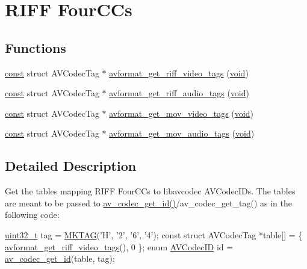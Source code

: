 \hypertarget{group__riff__fourcc}{}\section{R\+I\+FF Four\+C\+Cs}
\label{group__riff__fourcc}
\subsection*{Functions}
\begin{DoxyCompactItemize}
\item 
\hyperlink{getopt1_8c_a2c212835823e3c54a8ab6d95c652660e}{const} struct A\+V\+Codec\+Tag $\ast$ \hyperlink{group__riff__fourcc_ga036cfb1a22e899179f932df0cfc6c415}{avformat\+\_\+get\+\_\+riff\+\_\+video\+\_\+tags} (\hyperlink{sound_8c_ae35f5844602719cf66324f4de2a658b3}{void})
\item 
\hyperlink{getopt1_8c_a2c212835823e3c54a8ab6d95c652660e}{const} struct A\+V\+Codec\+Tag $\ast$ \hyperlink{group__riff__fourcc_ga8b9668cfd684804ebe7ab14b05aa3ba0}{avformat\+\_\+get\+\_\+riff\+\_\+audio\+\_\+tags} (\hyperlink{sound_8c_ae35f5844602719cf66324f4de2a658b3}{void})
\item 
\hyperlink{getopt1_8c_a2c212835823e3c54a8ab6d95c652660e}{const} struct A\+V\+Codec\+Tag $\ast$ \hyperlink{group__riff__fourcc_ga36261b12dba43e0cba5a753ecb3d0e54}{avformat\+\_\+get\+\_\+mov\+\_\+video\+\_\+tags} (\hyperlink{sound_8c_ae35f5844602719cf66324f4de2a658b3}{void})
\item 
\hyperlink{getopt1_8c_a2c212835823e3c54a8ab6d95c652660e}{const} struct A\+V\+Codec\+Tag $\ast$ \hyperlink{group__riff__fourcc_gac389e7f9cd19570bd599a61fd1884a4a}{avformat\+\_\+get\+\_\+mov\+\_\+audio\+\_\+tags} (\hyperlink{sound_8c_ae35f5844602719cf66324f4de2a658b3}{void})
\end{DoxyCompactItemize}


\subsection{Detailed Description}
Get the tables mapping R\+I\+FF Four\+C\+Cs to libavcodec A\+V\+Codec\+I\+Ds. The tables are meant to be passed to \hyperlink{group__lavf__misc_ga27b89fa8286af6efb5a69e8db4033b09}{av\+\_\+codec\+\_\+get\+\_\+id()}/av\+\_\+codec\+\_\+get\+\_\+tag() as in the following code\+: 
\begin{DoxyCode}
\hyperlink{lib-src_2ffmpeg_2win32_2stdint_8h_a6eb1e68cc391dd753bc8ce896dbb8315}{uint32\_t} tag = \hyperlink{ffmpeg_2libavutil_2common_8h_a19c68e2b5efcbab914d79db1e4fee734}{MKTAG}(\textcolor{charliteral}{'H'}, \textcolor{charliteral}{'2'}, \textcolor{charliteral}{'6'}, \textcolor{charliteral}{'4'});
\textcolor{keyword}{const} \textcolor{keyword}{struct }AVCodecTag *table[] = \{ \hyperlink{group__riff__fourcc_ga036cfb1a22e899179f932df0cfc6c415}{avformat\_get\_riff\_video\_tags}(), 0 \};
\textcolor{keyword}{enum} \hyperlink{group__lavc__core_gaadca229ad2c20e060a14fec08a5cc7ce}{AVCodecID} \textcolor{keywordtype}{id} = \hyperlink{group__lavf__misc_ga27b89fa8286af6efb5a69e8db4033b09}{av\_codec\_get\_id}(table, tag);
\end{DoxyCode}
 


